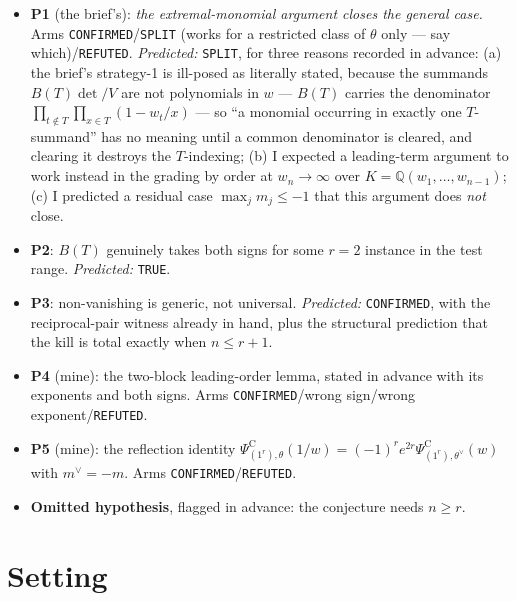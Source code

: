 \documentclass[11pt]{article}
\theoremstyle{definition}
\newcommand{\PsiC}{\Psi^{\mathrm{C}}}
\begin{document}
\begin{itemize}
\item \textbf{P1} (the brief's): \emph{the extremal-monomial argument closes the general
  case.} Arms \texttt{CONFIRMED}/\texttt{SPLIT} (works for a restricted class of $\theta$
  only --- say which)/\texttt{REFUTED}. \emph{Predicted:} \texttt{SPLIT}, for three reasons
  recorded in advance: (a) the brief's strategy-1 is ill-posed as literally stated, because
  the summands $B(T)\det/V$ are not polynomials in $w$ --- $B(T)$ carries the denominator
  $\prod_{t\notin T}\prod_{x\in T}(1-w_t/x)$ --- so ``a monomial occurring in exactly one
  $T$-summand'' has no meaning until a common denominator is cleared, and clearing it
  destroys the $T$-indexing; (b) I expected a leading-term argument to work instead in the
  grading by order at $w_n\to\infty$ over $K=\mathbb{Q}(w_1,\dots,w_{n-1})$; (c) I predicted
  a residual case $\max_jm_j\le-1$ that this argument does \emph{not} close.
\item \textbf{P2}: $B(T)$ genuinely takes both signs for some $r=2$ instance in the test
  range. \emph{Predicted:} \texttt{TRUE}.
\item \textbf{P3}: non-vanishing is generic, not universal. \emph{Predicted:}
  \texttt{CONFIRMED}, with the reciprocal-pair witness already in hand, plus the structural
  prediction that the kill is total exactly when $n\le r+1$.
\item \textbf{P4} (mine): the two-block leading-order lemma, stated in advance with its
  exponents and both signs. Arms \texttt{CONFIRMED}/wrong sign/wrong exponent/\texttt{REFUTED}.
\item \textbf{P5} (mine): the reflection identity
  $\PsiC_{(1^r),\theta}(1/w)=(-1)^re^{2r}\PsiC_{(1^r),\theta^\vee}(w)$ with $m^\vee=-m$.
  Arms \texttt{CONFIRMED}/\texttt{REFUTED}.
\item \textbf{Omitted hypothesis}, flagged in advance: the conjecture needs $n\ge r$.
\end{itemize}

\section{Setting}
\end{document}
